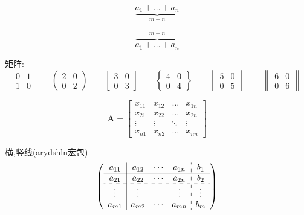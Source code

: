 \documentclass[UTF8,a4paper,8pt,no-math]{article} %
\numberwithin{equation}{section} %
\begin{document}
\begin{equation*}
	\underbrace{a_1+\ldots+a_n}_{m+n}
\end{equation*}

\begin{equation*}
	\overbrace{a_1+\ldots+a_n}^{m+n}
\end{equation*}

矩阵:
\begin{equation*}
	\begin{matrix}
		0 & 1 \\
		1 & 0
	\end{matrix}
	\qquad
	\begin{pmatrix}
		2 & 0 \\
		0 & 2
	\end{pmatrix}
	\qquad
	\begin{bmatrix}
		3 & 0 \\
		0 & 3
	\end{bmatrix}
	\qquad
	\begin{Bmatrix}
		4 & 0 \\
		0 & 4
	\end{Bmatrix}
	\qquad
	\begin{vmatrix}
		5 & 0 \\
		0 & 5
	\end{vmatrix}
	\qquad
	\begin{Vmatrix}
		6 & 0 \\
		0 & 6
	\end{Vmatrix}
\end{equation*}

\begin{equation*}
	\boldsymbol{A} = \begin{bmatrix}
		x_{11} & x_{12} & \ldots & x_{1n} \\
		x_{21} & x_{22} & \ldots & x_{2n} \\
		\vdots & \vdots & \ddots & \vdots \\
		x_{n1} & x_{n2} & \ldots & x_{nn}
	\end{bmatrix}
\end{equation*}

横,竖线(arydshln宏包)
\begin{equation*}
	\left(
	\begin{array}{c|ccc:c}
		a_{11} & a_{12} & \cdots & a_{1n} & b_1    \\
		\hline
		a_{21} & a_{22} & \cdots & a_{2n} & b_2    \\
		\hdashline
		\vdots & \vdots &        & \vdots & \vdots \\
		a_{m1} & a_{m2} & \cdots & a_{mn} & b_m
	\end{array}
	\right)
\end{equation*}
\end{document}
